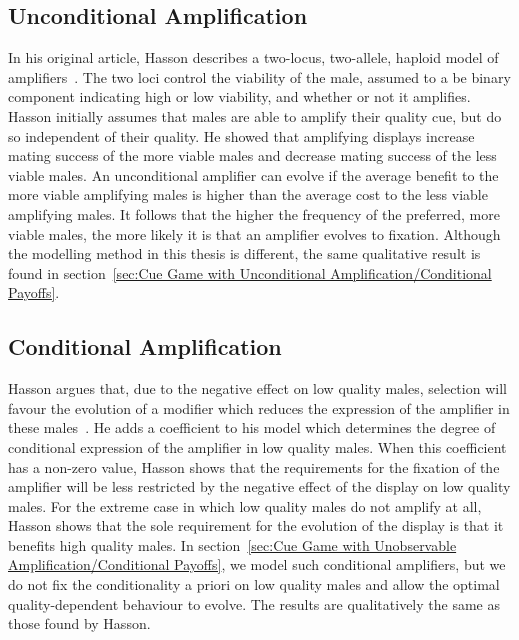 \documentclass[a4paper,12pt]{article}
\numberwithin{equation}{section}
\begin{document}
\subsection{Unconditional Amplification}
\label{sec:Unconditional Amplification}

In his original article, Hasson describes a two-locus, two-allele, haploid model of \linebreak amplifiers~\cite{Hasson1989}. The two loci control the viability of the male, assumed to a be binary component indicating high or low viability, and whether or not it amplifies. Hasson initially assumes that males are able to amplify their quality cue, but do so independent of their quality. He showed that amplifying displays increase mating success of the more viable males and decrease mating success of the less viable males. An unconditional amplifier can evolve if the average benefit to the more viable amplifying males is higher than the average cost to the less viable amplifying males. It follows that the higher the frequency of the preferred, more viable males, the more likely it is that an amplifier evolves to fixation. Although the modelling method in this thesis is different, the same qualitative result is found in section~\ref{sec:Cue Game with Unconditional Amplification/Conditional Payoffs}. 


\subsection{Conditional Amplification}
\label{sec:Conditional Amplification}

Hasson argues that, due to the negative effect on low quality males, selection will favour the evolution of a modifier which reduces the expression of the amplifier in these males~\cite{Hasson1989}. He adds a coefficient to his model which determines the degree of conditional expression of the amplifier in low quality males. When this coefficient has a non-zero value, Hasson shows that the requirements for the fixation of the amplifier will be less restricted by the negative effect of the display on low quality males. For the extreme case in which low quality males do not amplify at all, Hasson shows that the sole requirement for the evolution of the display is that it benefits high quality males. In section~\ref{sec:Cue Game with Unobservable Amplification/Conditional Payoffs}, we model such conditional amplifiers, but we do not fix the conditionality a priori on low quality males and allow the optimal quality-dependent behaviour to evolve. The results are qualitatively the same as those found by Hasson.
\end{document}
